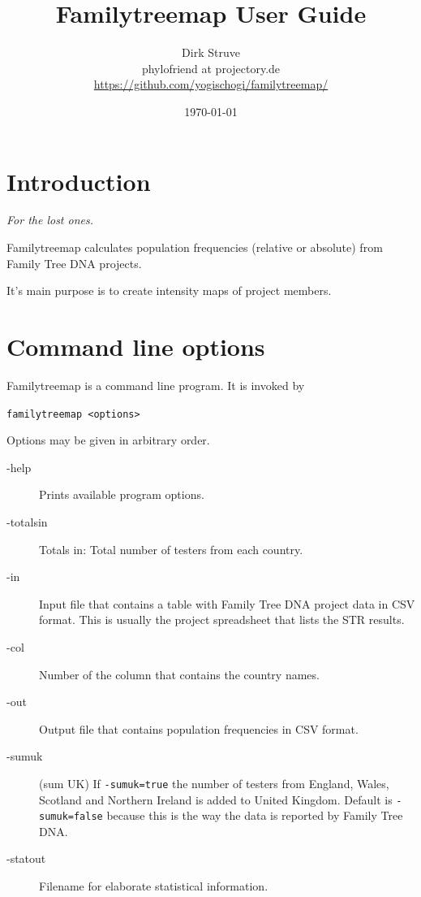 \documentclass[12pt,a4paper]{article}
\begin{document}
\title{Familytreemap User Guide}
\author{Dirk Struve\\
phylofriend at projectory.de\\
\href{https://github.com/yogischogi/familytreemap/}{https://github.com/yogischogi/familytreemap/}}
\date{\today}
\maketitle
\tableofcontents


\section{Introduction}

\hfill {\sl For the lost ones.}
\vspace{1em}

\noindent
Familytreemap calculates population frequencies
(relative or absolute) from Family Tree DNA projects.

It's main purpose is to create intensity maps of project members.


\section{Command line options}

Familytreemap is a command line program. It is invoked by

\vspace{1em}
\noindent\texttt{familytreemap <options>}

\vspace{1em}
\noindent Options may be given in arbitrary order.

\begin{description}
\item[-help] Prints available program options.
\item[-totalsin] Totals in: Total number of testers from each country.
\item[-in] Input file that contains a table with Family Tree DNA
  project data in CSV format. This is usually the project spreadsheet
  that lists the STR results.
\item[-col] Number of the column that contains the country names.
\item[-out] Output file that contains population frequencies in
  CSV format.
\item[-sumuk] (sum UK) If \texttt{-sumuk=true} the number of
  testers from England, Wales, Scotland and Northern Ireland
  is added to United Kingdom. Default is \texttt{-sumuk=false}
  because this is the way the data is reported by Family Tree DNA.
\item[-statout] Filename for elaborate statistical information.
\end{description}
\end{document}
